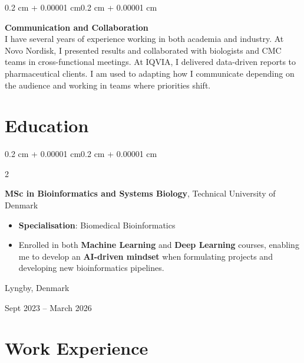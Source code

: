 \documentclass[10pt, letterpaper]{article}
\newenvironment{highlights}{
    \begin{itemize}[
        topsep=0.10 cm,
        parsep=0.10 cm,
        partopsep=0pt,
        itemsep=0pt,
        leftmargin=0.4 cm + 10pt
    ]
}{
    \end{itemize}
}
\newenvironment{onecolentry}{
    \begin{adjustwidth}{0.2 cm + 0.00001 cm}{0.2 cm + 0.00001 cm}
}{
    \end{adjustwidth}
}
\newenvironment{twocolentry}[2][]{
    \onecolentry
    \def\secondColumn{#2}
    \setcolumnwidth{\fill, 4.5 cm}
    \begin{paracol}{2}
}{
    \switchcolumn \raggedleft \secondColumn
    \end{paracol}
    \endonecolentry
}
\begin{document}
\begin{onecolentry}
        \vspace{0.3 cm}

        \textbf{Communication and Collaboration} \\
        I have several years of experience working in both academia and industry. At Novo Nordisk, I presented results and collaborated with biologists and CMC teams in cross-functional meetings. At IQVIA, I delivered data-driven reports to pharmaceutical clients. I am used to adapting how I communicate depending on the audience and working in teams where priorities shift.

    \end{onecolentry}

    \section{Education}

        \begin{twocolentry}{
    Lyngby, Denmark

    Sept 2023 -- March 2026
}
    \textbf{MSc in Bioinformatics and Systems Biology}, Technical University of Denmark
    \begin{highlights}
        \item \textbf{Specialisation}: Biomedical Bioinformatics
        \item Enrolled in both \textbf{Machine Learning} and \textbf{Deep Learning} courses, enabling me to develop an \textbf{AI-driven mindset} when formulating projects and developing new bioinformatics pipelines.
    \end{highlights}
\end{twocolentry}


    \section{Work Experience}
\end{document}
